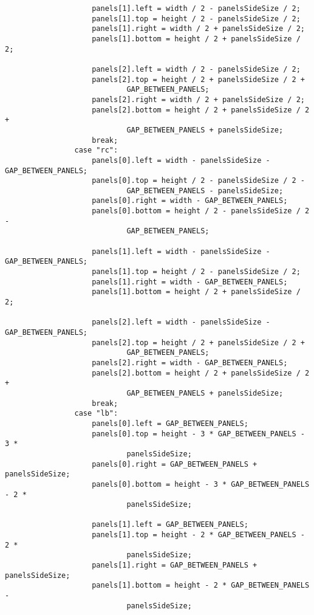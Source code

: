 \begin{verbatim}
                    panels[1].left = width / 2 - panelsSideSize / 2;
                    panels[1].top = height / 2 - panelsSideSize / 2;
                    panels[1].right = width / 2 + panelsSideSize / 2;
                    panels[1].bottom = height / 2 + panelsSideSize / 2;

                    panels[2].left = width / 2 - panelsSideSize / 2;
                    panels[2].top = height / 2 + panelsSideSize / 2 +
                            GAP_BETWEEN_PANELS;
                    panels[2].right = width / 2 + panelsSideSize / 2;
                    panels[2].bottom = height / 2 + panelsSideSize / 2 +
                            GAP_BETWEEN_PANELS + panelsSideSize;
                    break;
                case "rc":
                    panels[0].left = width - panelsSideSize - GAP_BETWEEN_PANELS;
                    panels[0].top = height / 2 - panelsSideSize / 2 -
                            GAP_BETWEEN_PANELS - panelsSideSize;
                    panels[0].right = width - GAP_BETWEEN_PANELS;
                    panels[0].bottom = height / 2 - panelsSideSize / 2 -
                            GAP_BETWEEN_PANELS;

                    panels[1].left = width - panelsSideSize - GAP_BETWEEN_PANELS;
                    panels[1].top = height / 2 - panelsSideSize / 2;
                    panels[1].right = width - GAP_BETWEEN_PANELS;
                    panels[1].bottom = height / 2 + panelsSideSize / 2;

                    panels[2].left = width - panelsSideSize - GAP_BETWEEN_PANELS;
                    panels[2].top = height / 2 + panelsSideSize / 2 +
                            GAP_BETWEEN_PANELS;
                    panels[2].right = width - GAP_BETWEEN_PANELS;
                    panels[2].bottom = height / 2 + panelsSideSize / 2 +
                            GAP_BETWEEN_PANELS + panelsSideSize;
                    break;
                case "lb":
                    panels[0].left = GAP_BETWEEN_PANELS;
                    panels[0].top = height - 3 * GAP_BETWEEN_PANELS - 3 *
                            panelsSideSize;
                    panels[0].right = GAP_BETWEEN_PANELS + panelsSideSize;
                    panels[0].bottom = height - 3 * GAP_BETWEEN_PANELS - 2 *
                            panelsSideSize;

                    panels[1].left = GAP_BETWEEN_PANELS;
                    panels[1].top = height - 2 * GAP_BETWEEN_PANELS - 2 *
                            panelsSideSize;
                    panels[1].right = GAP_BETWEEN_PANELS + panelsSideSize;
                    panels[1].bottom = height - 2 * GAP_BETWEEN_PANELS -
                            panelsSideSize;


\end{verbatim}
